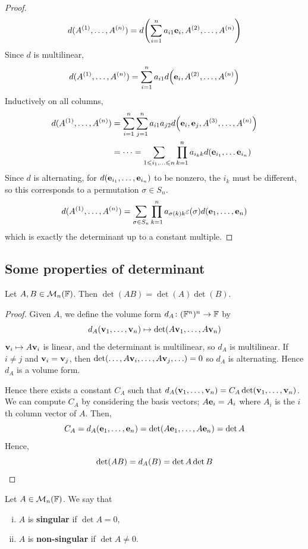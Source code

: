 \documentclass[a4paper,11pt]{article}
\begin{document}
\begin{proof}
	\[
		d(A^{(1)}, \dots, A^{(n)}) = d\qty(\sum_{i=1}^n a_{i1} {\bf e}_i, A^{(2)}, \dots, A^{(n)})
	\]
	Since $ d $ is multilinear,
	\[
		d(A^{(1)}, \dots, A^{(n)}) = \sum_{i=1}^n a_{i1} d\qty({\bf e}_i, A^{(2)}, \dots, A^{(n)})
	\]
	Inductively on all columns,
	\begin{align*}
		d(A^{(1)}, \dots, A^{(n)}) &= \sum_{i=1}^n \sum_{j=1}^n a_{i1} a_{j2} d\qty(\bfe_i, \bfe_j, A^{(3)}, \dots, A^{(n)}) \\ 
		&= \dots = \sum_{1 \leq i_1, \dots \leq n} \prod_{k=1}^n a_{i_k k} d(\bfe_{i_1}, \dots \bfe_{i_n})
	\end{align*}
	Since $ d $ is alternating, for $ d({\bf e}_{i_1}, \dots, {\bf e}_{i_n}) $ to be nonzero, the $ i_k $ must be different, so this corresponds to a permutation $ \sigma \in S_n $.
	\[
		d(A^{(1)}, \dots, A^{(n)}) = \sum_{\sigma \in S_n} \prod_{k=1}^n a_{\sigma(k) k} \varepsilon(\sigma) d({\bf e}_1, \dots, {\bf e}_n)
	\]
	which is exactly the determinant up to a constant multiple.
\end{proof}

\subsection{Some properties of determinant}

\begin{lemma}
	Let $ A, B \in {\mathcal{M}}_n({\mathbb{F}}) $.
	Then $ \det(AB) = \det(A) \det(B) $.
\end{lemma}
\begin{proof}
	Given $ A $, we define the volume form $ d_A \colon ({\mathbb{F}}^n)^n \to {\mathbb{F}} $ by
	\[
		d_A({\bf v}_1, \dots, {\bf v}_n) \mapsto \det(A {\bf v}_1, \dots, A {\bf v}_n)
	\]
	$ {\bf v}_i \mapsto A {\bf v}_i $ is linear, and the determinant is multilinear, so $ d_A $ is multilinear.
	If $ i \neq j $ and $ {\bf v}_i = {\bf v}_j $, then $ \det(\dots, A {\bf v}_i, \dots, A {\bf v}_j, \dots) = 0 $ so $ d_A $ is alternating.
	Hence $ d_A $ is a volume form.

	Hence there exists a constant $ C_A $ such that $ d_A({\bf v}_1, \dots, {\bf v}_n) = C_A \det({\bf v}_1, \dots, {\bf v}_n) $.
	We can compute $ C_A $ by considering the basis vectors; $ A {\bf e}_i = A_i $ where $ A_i $ is the $ i $th column vector of $ A $.
	Then,
	\[
		C_A = d_A({\bf e}_1, \dots, {\bf e}_n) = \det(A{\bf e}_1, \dots, A{\bf e}_n) = \det A
	\]
	Hence,
	\[
		\det(AB) = d_A(B) = \det A \det B\qedhere
	\]
\end{proof}

\begin{definition}
	Let $ A \in {\mathcal{M}}_n({\mathbb{F}}) $.
	We say that
	\begin{enumerate}[(i)]
		\item $ A $ is \textbf{singular} if $ \det A = 0 $,
		\item $ A $ is \textbf{non-singular} if $ \det A \neq 0 $.
	\end{enumerate}
\end{definition}
\end{document}
